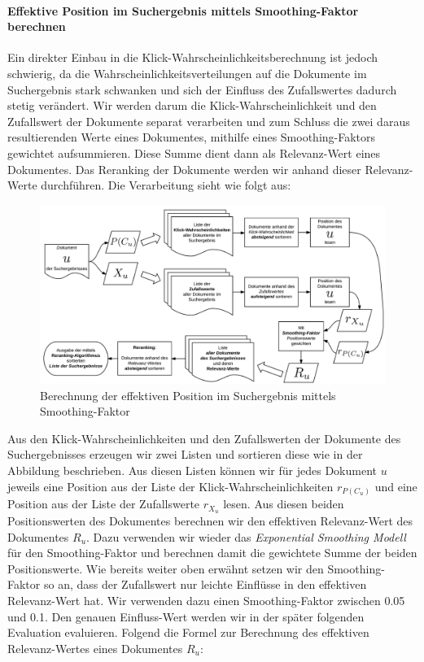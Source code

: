 \paragraph{Effektive Position im Suchergebnis mittels Smoothing-Faktor berechnen} 
Ein direkter Einbau in die Klick-Wahrscheinlichkeitsberechnung ist jedoch schwierig, da die Wahrscheinlichkeitsverteilungen auf die Dokumente im Suchergebnis stark schwanken und sich der Einfluss des Zufallswertes dadurch stetig verändert. Wir werden darum die Klick-Wahrscheinlichkeit und den Zufallswert der Dokumente separat verarbeiten und zum Schluss die zwei daraus resultierenden Werte eines Dokumentes, mithilfe eines Smoothing-Faktors gewichtet aufsummieren. Diese Summe dient dann als Relevanz-Wert eines Dokumentes. Das Reranking der Dokumente werden wir anhand dieser Relevanz-Werte durchführen. Die Verarbeitung sieht wie folgt aus:

\begin{figure}[H]
\centering
\vspace{-1em}
\caption[Berechnung der effektiven Position im Suchergebnis mittels Smoothing-Faktor]{Berechnung der effektiven Position im Suchergebnis mittels Smoothing-Faktor}
\label{fig:BerechnungRerankedPosition}
\includegraphics[width=\linewidth]{gfx/BerechnungRerankedPosition}
\vspace{-2.5em}
\end{figure}

Aus den Klick-Wahrscheinlichkeiten und den Zufallswerten der Dokumente des Suchergebnisses erzeugen wir zwei Listen und sortieren diese wie in der Abbildung beschrieben. Aus diesen Listen können wir für jedes Dokument $u$ jeweils eine Position aus der Liste der Klick-Wahrscheinlichkeiten $r_{P(C_{u})}$ und eine Position aus der Liste der Zufallswerte $r_{X_{u}}$ lesen. Aus diesen beiden Positionswerten des Dokumentes berechnen wir den effektiven Relevanz-Wert des Dokumentes $R_{u}$. Dazu verwenden wir wieder das \textit{Exponential Smoothing Modell} für den Smoothing-Faktor und berechnen damit die gewichtete Summe der beiden Positionswerte. Wie bereits weiter oben erwähnt setzen wir den Smoothing-Faktor so an, dass der Zufallswert nur leichte Einflüsse in den effektiven Relevanz-Wert hat. Wir verwenden dazu einen Smoothing-Faktor zwischen 0.05 und 0.1. Den genauen Einfluss-Wert werden wir in der später folgenden Evaluation evaluieren. Folgend die Formel zur Berechnung des effektiven Relevanz-Wertes eines Dokumentes $R_{u}$:

